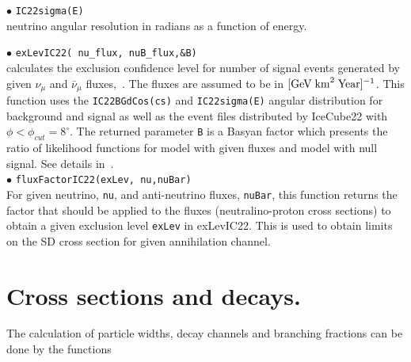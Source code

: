 \documentclass[12pt,a4paper]{article}
\begin{document}
 \noindent 
$\bullet$ \verb|IC22sigma(E)|\\
neutrino angular resolution in radians  as a function of energy. 

\noindent
$\bullet$ \verb|exLevIC22( nu_flux, nuB_flux,&B)|\\
 calculates the  exclusion confidence  level  for number of signal events 
generated by  given $\nu_{\mu}$ and  
$\bar{\nu}_{\mu}$  fluxes,~\cite{Belanger:2015hra}. The fluxes are assumed to be in
$[\rm{GeV\;km}^2\;\rm{Year}]^{-1}$.  This function uses
the \verb|IC22BGdCos(cs)| and \verb|IC22sigma(E)| angular distribution for background and 
signal as well as the event files distributed  by IceCube22 
with  $\phi<\phi_{cut}=8^{\circ} $.  The returned parameter \verb|B| is a
Basyan  factor which presents the ratio of likelihood functions for  model
with  given fluxes and model  with null signal.  See details in~\cite{Belanger:2015hra}.\\
\noindent  
$\bullet$ \verb|fluxFactorIC22(exLev, nu,nuBar)|\\
For given neutrino, \verb|nu|, and anti-neutrino fluxes, \verb|nuBar|, 
this function returns the factor that should be applied to the 
fluxes (neutralino-proton   cross sections)  to obtain a given exclusion
level {\tt exLev}  in exLevIC22. This is used to obtain  limits on the SD cross 
section for given annihilation channel.

\section{Cross sections and decays.}
\label{cross_section}

The calculation of particle widths, decay channels  and branching fractions
can be done by the functions\\
\end{document}

